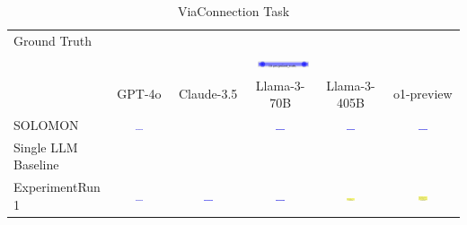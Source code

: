 \begin{table}
  \caption{ViaConnection Task}
  \label{table:viaconnection}
  \centering
  \begin{tabular}{@{}lccccc@{}}
    \toprule
    Ground Truth \\
    & \multicolumn{5}{c}{\includegraphics[width=0.15\textwidth]{examples_png/ViaConnection.png}} \\
    & GPT-4o & Claude-3.5 & Llama-3-70B & Llama-3-405B & o1-preview \\
    \midrule
    SOLOMON & \includegraphics[width=0.15\textwidth]{./pool_all/png/gpt-4o_results/ViaConnection.png} &  & \includegraphics[width=0.15\textwidth]{./pool_all/png/claude-3-5-sonnet-20240620_results/ViaConnection.png} & \includegraphics[width=0.15\textwidth]{./pool_all/png/watsonx_meta-llama_llama-3-1-70b-instruct_results/ViaConnection.png} & \includegraphics[width=0.15\textwidth]{./pool_all/png/watsonx_meta-llama_llama-3-405b-instruct_results/ViaConnection.png} \\
    Single LLM Baseline \\
    ExperimentRun 1 & \includegraphics[width=0.15\textwidth]{./run_1/png/gpt-4o_results/ViaConnection.png} & \includegraphics[width=0.15\textwidth]{./run_1/png/o1-preview_results/ViaConnection.png} & \includegraphics[width=0.15\textwidth]{./run_1/png/claude-3-5-sonnet-20240620_results/ViaConnection.png} & \includegraphics[width=0.15\textwidth]{./run_1/png/watsonx_meta-llama_llama-3-1-70b-instruct_results/ViaConnection.png} & \includegraphics[width=0.15\textwidth]{./run_1/png/watsonx_meta-llama_llama-3-405b-instruct_results/ViaConnection.png} \\

\end{tabular}
\end{table}
